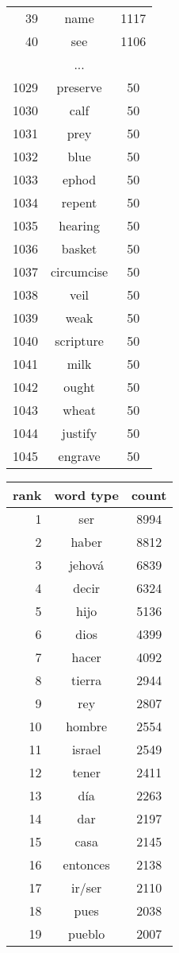 \begin{figure*}
\begin{tiny}
\begin{centering}
\begin{tabular}{|r|c|c|}
39 & name & 1117 \\
40 & see & 1106 \\
    \multicolumn{3}{|c|}{...} \\ 
1029 & preserve & 50 \\
1030 & calf & 50 \\
1031 & prey & 50 \\
1032 & blue & 50 \\
1033 & ephod & 50 \\
1034 & repent & 50 \\
1035 & hearing & 50 \\
1036 & basket & 50 \\
1037 & circumcise & 50 \\
1038 & veil & 50 \\
1039 & weak & 50 \\
1040 & scripture & 50 \\
1041 & milk & 50 \\
1042 & ought & 50 \\
1043 & wheat & 50 \\
1044 & justify & 50 \\
1045 & engrave & 50 \\
    \hline
  \end{tabular}
  \quad
  \begin{tabular}{|r|c|c|}
    \hline
    rank & word type & count \\
    \hline
1 & ser & 8994 \\
2 & haber & 8812 \\
3 & jehová & 6839 \\
4 & decir & 6324 \\
5 & hijo & 5136 \\
6 & dios & 4399 \\
7 & hacer & 4092 \\
8 & tierra & 2944 \\
9 & rey & 2807 \\
10 & hombre & 2554 \\
11 & israel & 2549 \\
12 & tener & 2411 \\
13 & día & 2263 \\
14 & dar & 2197 \\
15 & casa & 2145 \\
16 & entonces & 2138 \\
17 & ir/ser & 2110 \\
18 & pues & 2038 \\
19 & pueblo & 2007 \\

\end{tabular}
\end{centering}
\end{tiny}
\end{figure*}
